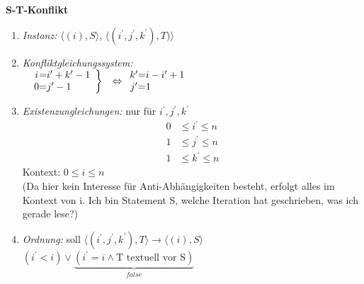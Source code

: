\textbf{S-T-Konflikt}\\
\begin{enumerate}
    \item \textit{Instanz:} $\langle (i), S \rangle$, $\langle (i^\prime, j^\prime, k^\prime), T) \rangle$

    \item \textit{Konfliktgleichungssystem:} \\
        $\begin{array}{cc}
        \left.
        \begin{array}{c@= l}
            i & i^\prime + k^\prime-1\\
            0 & j^\prime -1
        \end{array} \right\} & \Leftrightarrow
        \begin{array}{c@= l}
            k^\prime & i-i^\prime +1 \\
            j^\prime & 1
        \end{array}
        \end{array}$


    \item \textit{Existenzungleichungen:} nur für $i^\prime, j^\prime, k^\prime$\\
        \begin{align*}
        0 &\leq i^\prime \leq n \\
        1 &\leq j^\prime \leq n \\
        1 &\leq k^\prime \leq n
        \end{align*}
        Kontext: $0 \leq i \leq n$\\
        (Da hier kein Interesse für Anti-Abhängigkeiten besteht, erfolgt alles im Kontext von i. \glqq Ich bin Statement S, welche Iteration hat geschrieben, was ich gerade lese?\grqq)
    \item \textit{Ordnung:} soll $\langle ( i^\prime, j^\prime, k^\prime), T \rangle \rightarrow \langle (i), S \rangle$\\

    $(i^\prime < i) \lor \underbrace{(i^\prime = i \land \text{T textuell vor S})}_{false}$



\end{enumerate}
